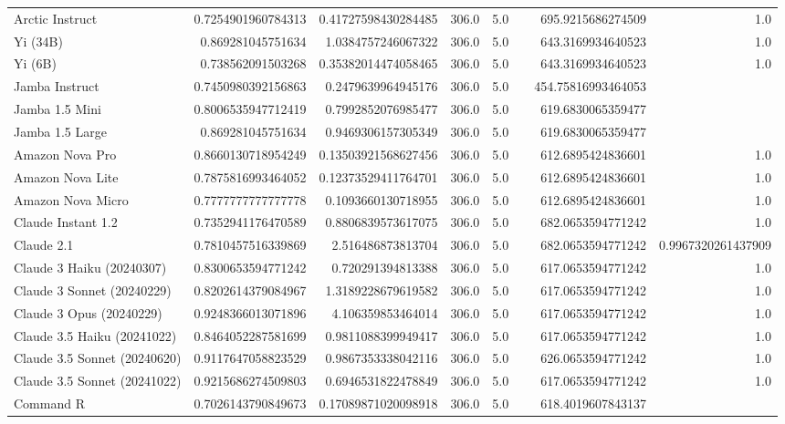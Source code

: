 \begin{table}[htp]
{\begin{tabular}{lrrrrrrr}
Arctic Instruct & 0.7254901960784313 & 0.41727598430284485 & 306.0 & 5.0 &  & 695.9215686274509 & 1.0 \\
Yi (34B) & 0.869281045751634 & 1.0384757246067322 & 306.0 & 5.0 &  & 643.3169934640523 & 1.0 \\
Yi (6B) & 0.738562091503268 & 0.35382014474058465 & 306.0 & 5.0 &  & 643.3169934640523 & 1.0 \\
Jamba Instruct & 0.7450980392156863 & 0.2479639964945176 & 306.0 & 5.0 &  & 454.75816993464053 &  \\
Jamba 1.5 Mini & 0.8006535947712419 & 0.7992852076985477 & 306.0 & 5.0 &  & 619.6830065359477 &  \\
Jamba 1.5 Large & 0.869281045751634 & 0.9469306157305349 & 306.0 & 5.0 &  & 619.6830065359477 &  \\
Amazon Nova Pro & 0.8660130718954249 & 0.13503921568627456 & 306.0 & 5.0 &  & 612.6895424836601 & 1.0 \\
Amazon Nova Lite & 0.7875816993464052 & 0.12373529411764701 & 306.0 & 5.0 &  & 612.6895424836601 & 1.0 \\
Amazon Nova Micro & 0.7777777777777778 & 0.1093660130718955 & 306.0 & 5.0 &  & 612.6895424836601 & 1.0 \\
Claude Instant 1.2 & 0.7352941176470589 & 0.8806839573617075 & 306.0 & 5.0 &  & 682.0653594771242 & 1.0 \\
Claude 2.1 & 0.7810457516339869 & 2.516486873813704 & 306.0 & 5.0 &  & 682.0653594771242 & 0.9967320261437909 \\
Claude 3 Haiku (20240307) & 0.8300653594771242 & 0.720291394813388 & 306.0 & 5.0 &  & 617.0653594771242 & 1.0 \\
Claude 3 Sonnet (20240229) & 0.8202614379084967 & 1.3189228679619582 & 306.0 & 5.0 &  & 617.0653594771242 & 1.0 \\
Claude 3 Opus (20240229) & 0.9248366013071896 & 4.106359853464014 & 306.0 & 5.0 &  & 617.0653594771242 & 1.0 \\
Claude 3.5 Haiku (20241022) & 0.8464052287581699 & 0.9811088399949417 & 306.0 & 5.0 &  & 617.0653594771242 & 1.0 \\
Claude 3.5 Sonnet (20240620) & 0.9117647058823529 & 0.9867353338042116 & 306.0 & 5.0 &  & 626.0653594771242 & 1.0 \\
Claude 3.5 Sonnet (20241022) & 0.9215686274509803 & 0.6946531822478849 & 306.0 & 5.0 &  & 617.0653594771242 & 1.0 \\
Command R & 0.7026143790849673 & 0.17089871020098918 & 306.0 & 5.0 &  & 618.4019607843137 &  \\

\end{tabular}}
\end{table}
